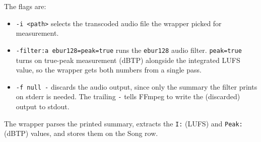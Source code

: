 The flags are:
\begin{itemize}
    \item \texttt{-i <path>} selects the transcoded audio file the
    wrapper picked for measurement.
    \item \texttt{-filter:a ebur128=peak=true} runs the
    \texttt{ebur128} audio filter. \texttt{peak=true} turns on
    true-peak measurement (dBTP) alongside the integrated LUFS
    value, so the wrapper gets both numbers from a single pass.
    \item \texttt{-f null -} discards the audio output, since only
    the summary the filter prints on stderr is needed. The
    trailing \texttt{-} tells FFmpeg to write the (discarded)
    output to stdout.
\end{itemize}

The wrapper parses the printed summary, extracts the \texttt{I:}
(LUFS) and \texttt{Peak:} (dBTP) values, and stores them on the
Song row.
